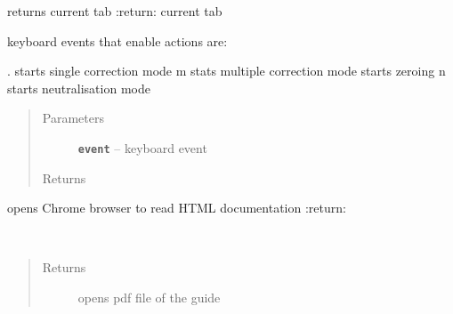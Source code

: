 \documentclass[letterpaper,10pt,english]{sphinxmanual}
\begin{document}
\begin{fulllineitems}
\begin{fulllineitems}
\end{fulllineitems}


\begin{fulllineitems}
\label{Cormat_main:Cormat_main.CORMAT_GUI.check_current_tab}
returns current tab
:return: current tab

\end{fulllineitems}


\begin{fulllineitems}
\label{Cormat_main:Cormat_main.CORMAT_GUI.keyPressEvent}
keyboard events that enable actions are:

. starts single correction mode
m stats multiple correction mode
starts zeroing
n starts neutralisation mode
\begin{quote}\begin{description}
\item[{Parameters}] \leavevmode
\textbf{\texttt{event}} -- keyboard event

\item[{Returns}] \leavevmode


\end{description}\end{quote}

\end{fulllineitems}


\begin{fulllineitems}
\label{Cormat_main:Cormat_main.CORMAT_GUI.handle_help_menu}
opens Chrome browser to read HTML documentation
:return:

\end{fulllineitems}


\begin{fulllineitems}
\label{Cormat_main:Cormat_main.CORMAT_GUI.handle_pdf_open}~\begin{quote}\begin{description}
\item[{Returns}] \leavevmode
opens pdf file of the guide


\end{description}
\end{quote}
\end{fulllineitems}
\end{fulllineitems}
\end{document}
